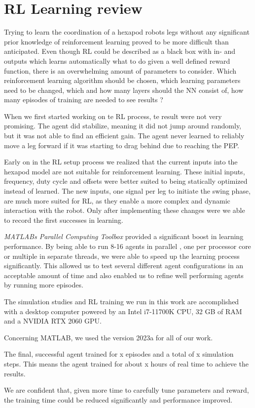\section{RL Learning review}
Trying to learn the coordination of a hexapod robots legs without any significant prior knowledge of reinforcement learning proved to be more difficult than anticipated.
Even though RL could be described as a black box with in- and outputs which learns automatically what to do given a well defined reward function, there is an overwhelming amount of parameters to consider.
Which reinforcement learning algorithm should be chosen, which learning parameters need to be changed, which and how many layers should the NN consist of, how many episodes of training are needed to see results ?


When we first started working on te RL process, te result were not very promising. The agent did stabilize, meaning it did not jump around randomly, but it was not able to find an efficient gain.
The agent never learned to reliably move a leg forward if it was starting to drag behind due to reaching the PEP.

Early on in the RL setup process we realized that the current inputs into the hexapod model are not suitable for reinforcement learning.
These initial inputs, frequency, duty cycle and offsets were better suited to being statically optimized instead of learned.
The new inputs, one signal per leg to initiate the swing phase, are much more suited for RL, as they enable a more complex and dynamic interaction with the robot.
Only after implementing these changes were we able to record the first successes in learning.


\textit{MATLABs Parallel Computing Toolbox} provided a significant boost in learning performance.
By being able to run 8-16 agents in parallel , one per processor core or multiple in separate threads, we were able to speed up the learning process significantly.
This allowed us to test several different agent configurations in an acceptable amount of time and also enabled us to refine well performing agents by running more episodes.

The simulation studies and RL training we run in this work are accomplished with a desktop computer powered by an Intel i7-11700K CPU, 32 GB of RAM and a NVIDIA RTX 2060 GPU.

Concerning MATLAB, we used the version 2023a for all of our work.


The final, successful agent trained for x episodes and a total of x simulation steps. 
This means the agent trained for about x hours of real time to achieve the results.

We are confident that, given more time to carefully tune parameters and reward, the training time could be reduced significantly and performance improved.

